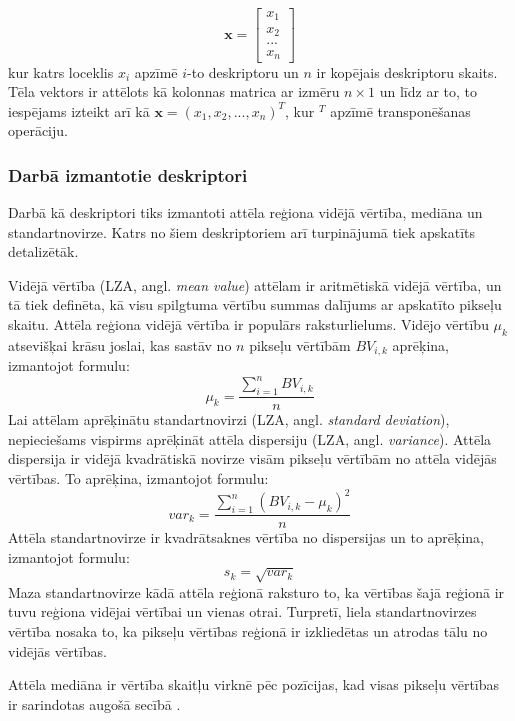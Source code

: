\documentclass[12pt,paper=a4]{report}
\begin{document}
\begin{equation}
\textbf{x}=\begin{bmatrix}
x_1\\ 
x_2\\ 
...\\ 
x_n
\end{bmatrix}
\end{equation}
kur katrs loceklis $ x_i $ apzīmē $i$-to deskriptoru un $n$ ir kopējais deskriptoru skaits. Tēla vektors ir attēlots kā kolonnas matrica ar izmēru $n \times 1$ un līdz ar to, to iespējams izteikt arī kā $ \textbf{x}=(x_1, x_2, ..., x_n)^T $, kur $^T$ apzīmē transponēšanas operāciju. \cite{gonzalez2002digital} \par
\subsubsection{Darbā izmantotie deskriptori}
Darbā kā deskriptori tiks izmantoti attēla reģiona vidējā vērtība, mediāna un standartnovirze. Katrs no šiem deskriptoriem arī turpinājumā tiek apskatīts detalizētāk.\par
Vidējā vērtība (LZA, angl. \textit{mean value}) attēlam ir aritmētiskā vidējā vērtība, un tā tiek definēta, kā visu spilgtuma vērtību summas dalījums ar apskatīto pikseļu skaitu. Attēla reģiona vidējā vērtība ir populārs raksturlielums. Vidējo vērtību $\mu _k$ atsevišķai krāsu joslai, kas sastāv no $n$ pikseļu vērtībām $BV_{i,k}$ aprēķina, izmantojot formulu:
\begin{equation}
\mu _k=\frac{\sum_{i=1}^{n}BV_{i,k}}{n}
\end{equation}
Lai attēlam aprēķinātu standartnovirzi (LZA, angl. \textit{standard deviation}), nepieciešams vispirms aprēķināt attēla dispersiju (LZA, angl. \textit{variance}). Attēla dispersija ir vidējā kvadrātiskā novirze visām pikseļu vērtībām no attēla vidējās vērtības. To aprēķina, izmantojot formulu:
\begin{equation}
var_k=\frac{\sum_{i=1}^{n}{(BV_{i,k}-\mu_k)^2}}{n}
\end{equation}
Attēla standartnovirze ir kvadrātsaknes vērtība no dispersijas un to aprēķina, izmantojot formulu:
\begin{equation}
s_k=\sqrt{var_k}
\end{equation}
Maza standartnovirze kādā attēla reģionā raksturo to, ka vērtības šajā reģionā ir tuvu reģiona vidējai vērtībai un vienas otrai. Turpretī, liela standartnovirzes vērtība nosaka to, ka pikseļu vērtības reģionā ir izkliedētas un atrodas tālu no vidējās vērtības. \cite{stdMeanMedian}\par
Attēla mediāna ir vērtība skaitļu virknē pēc pozīcijas, kad visas pikseļu vērtības ir sarindotas augošā secībā \cite{stdMeanMedian}.
\end{document}
